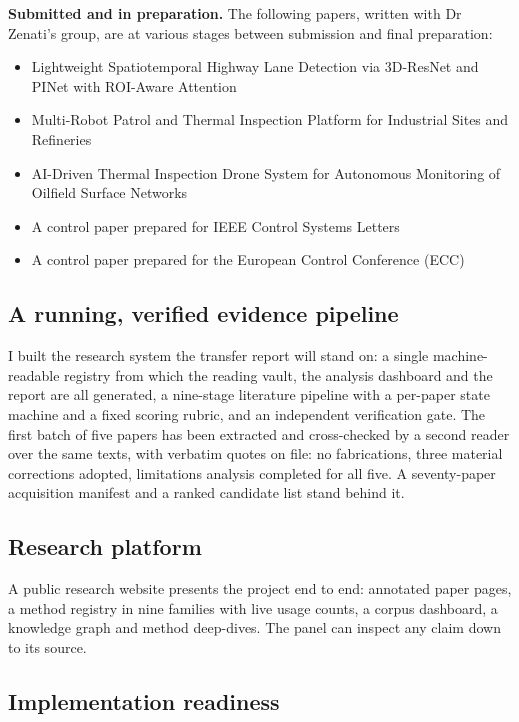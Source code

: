 \documentclass[11pt,a4paper]{article}
\begin{document}
\textbf{Submitted and in preparation.} The following papers, written with Dr Zenati's group, are at various stages between submission and final preparation:
\begin{itemize}
  \item Lightweight Spatiotemporal Highway Lane Detection via 3D-ResNet and PINet with ROI-Aware Attention
  \item Multi-Robot Patrol and Thermal Inspection Platform for Industrial Sites and Refineries
  \item AI-Driven Thermal Inspection Drone System for Autonomous Monitoring of Oilfield Surface Networks
  \item A control paper prepared for IEEE Control Systems Letters
  \item A control paper prepared for the European Control Conference (ECC)
\end{itemize}

\subsection{A running, verified evidence pipeline}

I built the research system the transfer report will stand on: a single machine-readable registry from which the reading vault, the analysis dashboard and the report are all generated, a nine-stage literature pipeline with a per-paper state machine and a fixed scoring rubric, and an independent verification gate. The first batch of five papers has been extracted and cross-checked by a second reader over the same texts, with verbatim quotes on file: no fabrications, three material corrections adopted, limitations analysis completed for all five. A seventy-paper acquisition manifest and a ranked candidate list stand behind it.

\subsection{Research platform}

A public research website presents the project end to end: annotated paper pages, a method registry in nine families with live usage counts, a corpus dashboard, a knowledge graph and method deep-dives. The panel can inspect any claim down to its source.

\subsection{Implementation readiness}
\end{document}
